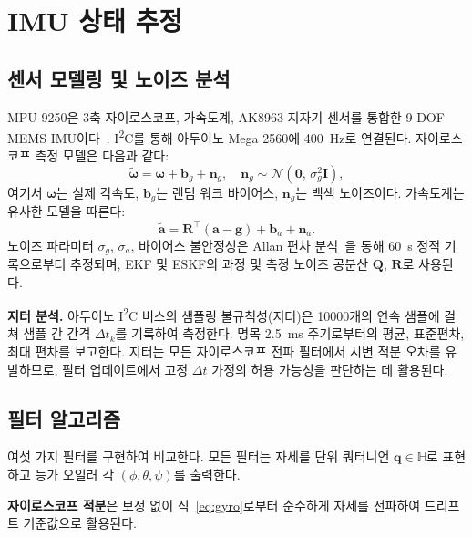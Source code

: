 \section{IMU 상태 추정}
\label{sec:imu}

\subsection{센서 모델링 및 노이즈 분석}

MPU-9250은 3축 자이로스코프, 가속도계, AK8963 지자기 센서를 통합한 9-DOF MEMS IMU이다~\cite{invensense2016}.
I\textsuperscript{2}C를 통해 아두이노 Mega 2560에 \SI{400}{\hertz}로 연결된다.
자이로스코프 측정 모델은 다음과 같다:
\begin{equation}
    \tilde{\boldsymbol{\omega}} = \boldsymbol{\omega} + \mathbf{b}_g + \mathbf{n}_g, \quad
    \mathbf{n}_g \sim \mathcal{N}(\mathbf{0},\,\sigma_g^2\mathbf{I}),
    \label{eq:gyro}
\end{equation}
여기서 $\boldsymbol{\omega}$는 실제 각속도, $\mathbf{b}_g$는 랜덤 워크 바이어스,
$\mathbf{n}_g$는 백색 노이즈이다.
가속도계는 유사한 모델을 따른다:
\begin{equation}
    \tilde{\mathbf{a}} = \mathbf{R}^\top(\mathbf{a} - \mathbf{g}) + \mathbf{b}_a + \mathbf{n}_a.
    \label{eq:accel}
\end{equation}
노이즈 파라미터 $\sigma_g$, $\sigma_a$, 바이어스 불안정성은
Allan 편차 분석~\cite{ieee1998allan}을 통해 \SI{60}{\second} 정적 기록으로부터 추정되며,
EKF 및 ESKF의 과정 및 측정 노이즈 공분산 $\mathbf{Q}$, $\mathbf{R}$로 사용된다.

\textbf{지터 분석.}
아두이노 I\textsuperscript{2}C 버스의 샘플링 불규칙성(지터)은
\num{10000}개의 연속 샘플에 걸쳐 샘플 간 간격 $\Delta t_k$를 기록하여 측정한다.
명목 \SI{2.5}{\milli\second} 주기로부터의 평균, 표준편차, 최대 편차를 보고한다.
지터는 모든 자이로스코프 전파 필터에서 시변 적분 오차를 유발하므로,
필터 업데이트에서 고정 $\Delta t$ 가정의 허용 가능성을 판단하는 데 활용된다.

\subsection{필터 알고리즘}

여섯 가지 필터를 구현하여 비교한다.
모든 필터는 자세를 단위 쿼터니언 $\mathbf{q} \in \mathbb{H}$로 표현하고
등가 오일러 각 $(\phi,\theta,\psi)$를 출력한다.

\textbf{자이로스코프 적분}은 보정 없이 식~\eqref{eq:gyro}로부터 순수하게 자세를 전파하여
드리프트 기준값으로 활용된다.

